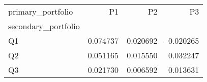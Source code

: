 \begin{tabular}{lrrr}
\toprule
primary_portfolio & P1 & P2 & P3 \\
secondary_portfolio &  &  &  \\
\midrule
Q1 & 0.074737 & 0.020692 & -0.020265 \\
Q2 & 0.051165 & 0.015550 & 0.032247 \\
Q3 & 0.021730 & 0.006592 & 0.013631 \\
\bottomrule
\end{tabular}
